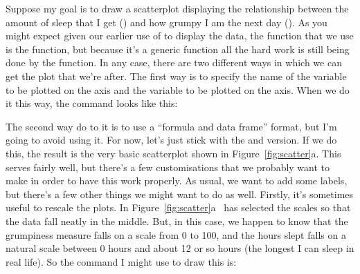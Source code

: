 Suppose my goal is to draw a scatterplot displaying the relationship between the amount of sleep that I get () and how grumpy I am the next day (). As you might expect given our earlier use of  to display the  data, the function that we use is the  function, but because it's a generic function all the hard work is still being done by the  function. In any case, there are two different ways in which we can get the plot that we're after. The first way is to specify the name of the variable to be plotted on the  axis and the variable to be plotted on the  axis. When we do it this way, the command looks like this:
The second way do to it is to use a ``formula and data frame'' format, but I'm going to avoid using it. For now, let's just stick with the  and  version. If we do this, the result is the very basic scatterplot shown in Figure~\ref{fig:scatter}a. This serves fairly well, but there's a few customisations that we probably want to make in order to have this work properly. As usual, we want to add some labels, but there's a few other things we might want to do as well. Firstly, it's sometimes useful to rescale the plots. In Figure~\ref{fig:scatter}a \R\ has selected the scales so that the data fall neatly in the middle. But, in this case, we happen to know that the grumpiness measure falls on a scale from 0 to 100, and the hours slept falls on a natural scale between 0 hours and about 12 or so hours (the longest I can sleep in real life). So the command I might use to draw this is:
